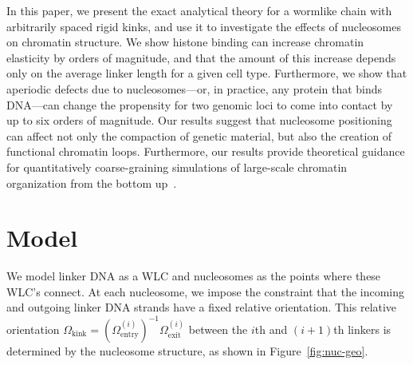 \documentclass[%
 reprint,
superscriptaddress,
showpacs,preprintnumbers,
 amsmath,amssymb,
 aps,
 prl,
]{revtex4-1}
\begin{document}
In this paper, we present the exact analytical theory for a wormlike chain
    with arbitrarily spaced rigid kinks, and use it to investigate the effects
    of nucleosomes on chromatin structure.
We show histone binding can increase chromatin elasticity by orders of
    magnitude, and that the amount of this increase depends only on the average
    linker length for a given cell type.
Furthermore, we show that aperiodic defects due to nucleosomes---or, in
    practice, any protein that binds DNA---can change the
    propensity for two genomic loci to come into contact by up to six
    orders of magnitude.
Our results suggest that nucleosome positioning can affect not only
    the compaction of genetic material, but also the creation of
    functional chromatin loops. %
Furthermore, our results provide theoretical guidance for quantitatively
    coarse-graining simulations of large-scale chromatin organization from the
    bottom up~\cite{macphersonInPress}.

\section{\label{sec:model}Model}
We model linker DNA as a WLC and nucleosomes as the points where these
    WLC's connect.
At each nucleosome, we impose the constraint that the incoming and outgoing
    linker DNA strands have a fixed relative orientation. This relative
    orientation $\Omega_\text{kink}  = {(\Omega^{(i)}_\text{entry})}^{-1}
    \Omega^{(i)}_\text{exit}$ between the $i$th and $(i+1)$th linkers is
    determined by the nucleosome structure, as shown in
    Figure~\ref{fig:nuc-geo}.
\end{document}
